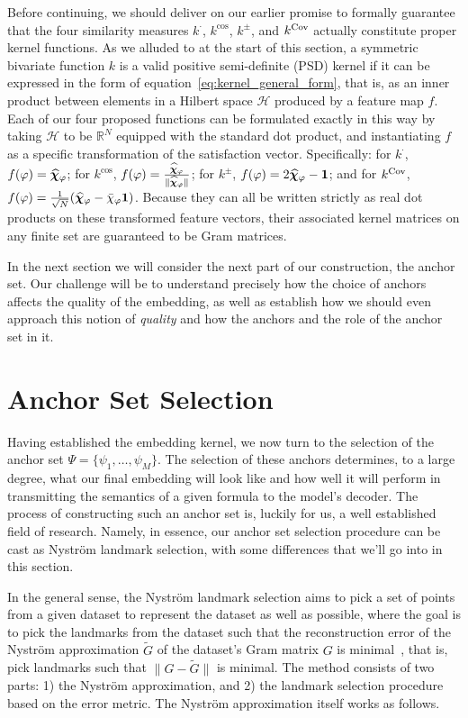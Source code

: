 \documentclass[titlepage,a4paper,11pt]{report}
\begin{document}
    Before continuing, we should deliver on our earlier promise to formally guarantee that the four similarity measures $k^\cdot$, $k^{\cos}$, $k^\pm$, and $k^{\mathrm{Cov}}$ actually constitute proper kernel functions. As we alluded to at the start of this section, a symmetric bivariate function $k$ is a valid positive semi-definite (PSD) kernel if it can be expressed in the form of equation~\eqref{eq:kernel_general_form}, that is, as an inner product between elements in a Hilbert space $\mathcal{H}$ produced by a feature map $f$. Each of our four proposed functions can be formulated exactly in this way by taking $\mathcal{H}$ to be $\mathbb{R}^N$ equipped with the standard dot product, and instantiating $f$ as a specific transformation of the satisfaction vector. Specifically: for $k^\cdot$, $f(\varphi) = \bm{\widehat\chi}_\varphi$; for $k^{\cos}$, $f(\varphi) = \frac{\bm{\widehat\chi}_\varphi}{\Vert \bm{\widehat\chi}_\varphi \Vert}$; for $k^\pm$, $f(\varphi) = 2\bm{\widehat\chi}_\varphi - \mathbf{1}$; and for $k^{\mathrm{Cov}}$, $f(\varphi) = \frac{1}{\sqrt{N}} (\bm{\widehat\chi}_\varphi - \bar{\chi}_\varphi \mathbf{1})$. Because they can all be written strictly as real dot products on these transformed feature vectors, their associated kernel matrices on any finite set are guaranteed to be Gram matrices.

    In the next section we will consider the next part of our construction, the anchor set. Our challenge will be to understand precisely how the choice of anchors affects the quality of the embedding, as well as establish how we should even approach this notion of \textit{quality} and how the anchors and the role of the anchor set in it.  

    
    \section{Anchor Set Selection}\label{sec:anchor_selection}
    Having established the embedding kernel, we now turn to the selection of the anchor set $\Psi = \{\psi_1, \dots, \psi_M\}$. The selection of these anchors determines, to a large degree, what our final embedding will look like and how well it will perform in transmitting the semantics of a given formula to the model's decoder. The process of constructing such an anchor set is, luckily for us, a well established field of research. Namely, in essence, our anchor set selection procedure can be cast as Nyström landmark selection, with some differences that we'll go into in this section.

    In the general sense, the Nyström landmark selection aims to pick a set of points from a given dataset to represent the dataset as well as possible, where the goal is to pick the landmarks from the dataset such that the reconstruction error of the Nyström approximation $\tilde G$ of the dataset's Gram matrix $G$ is minimal~\citep{belabbas_landmark_2009, drineas_nystrom_2005,kumar_sampling_2012}, that is, pick landmarks such that $\lVert G-\tilde G\rVert$ is minimal. The method consists of two parts: 1) the Nyström approximation, and 2) the landmark selection procedure based on the error metric. The Nyström approximation itself works as follows.
    
\end{document}
